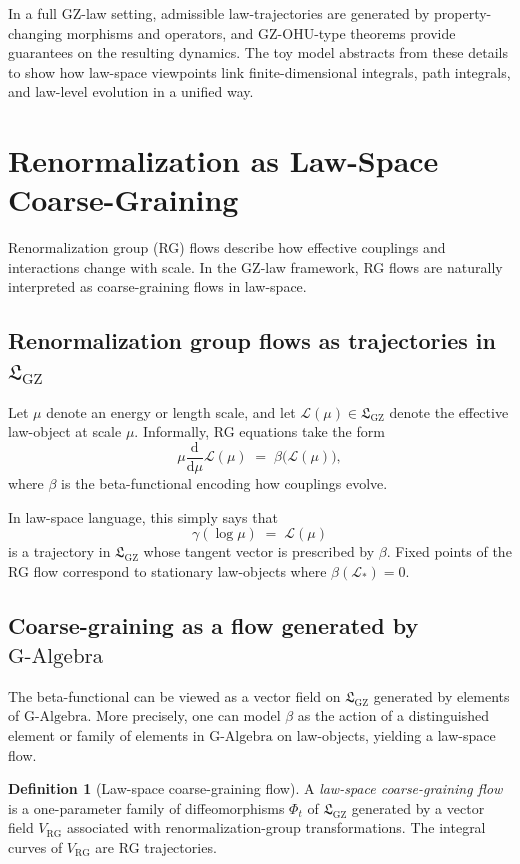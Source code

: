 \documentclass[11pt]{book}
\newcommand{\GAlgebra}{\text{G-Algebra}}
\newcommand{\GZLS}{\ensuremath{\mathfrak{L}_{\mathrm{GZ}}}}
\theoremstyle{plain}
\theoremstyle{definition}
\newtheorem{definition}[theorem]{Definition}
\theoremstyle{remark}
\begin{document}
In a full GZ-law setting, admissible law-trajectories are generated by
property-changing morphisms and operators, and GZ-OHU-type theorems
provide guarantees on the resulting dynamics. The toy model abstracts
from these details to show how law-space viewpoints link
finite-dimensional integrals, path integrals, and law-level evolution
in a unified way.



\section{Renormalization as Law-Space Coarse-Graining}
\label{sec:renorm-law-coarse}



Renormalization group (RG) flows describe how effective couplings and
interactions change with scale. In the GZ-law framework, RG flows are
naturally interpreted as coarse-graining flows in law-space.

\subsection{Renormalization group flows as trajectories in \texorpdfstring{$\GZLS$}{GZ-LS}}

Let $\mu$ denote an energy or length scale, and let
$\mathcal{L}(\mu) \in \GZLS$ denote the effective law-object at scale
$\mu$. Informally, RG equations take the form
\[
   \mu \frac{\mathrm{d}}{\mathrm{d}\mu} \mathcal{L}(\mu)
   \;=\;
   \beta\bigl(\mathcal{L}(\mu)\bigr),
\]
where $\beta$ is the beta-functional encoding how couplings evolve.

In law-space language, this simply says that
\[
   \gamma(\log\mu) \;=\; \mathcal{L}(\mu)
\]
is a trajectory in $\GZLS$ whose tangent vector is prescribed by
$\beta$. Fixed points of the RG flow correspond to stationary
law-objects where $\beta(\mathcal{L}_\ast) = 0$.

\subsection{Coarse-graining as a flow generated by \texorpdfstring{$\GAlgebra$}{G-Algebra}}

The beta-functional can be viewed as a vector field on $\GZLS$
generated by elements of $\GAlgebra$. More precisely, one can model
$\beta$ as the action of a distinguished element or family of elements
in $\GAlgebra$ on law-objects, yielding a law-space flow.

\begin{definition}[Law-space coarse-graining flow]
  A \emph{law-space coarse-graining flow} is a one-parameter family of
  diffeomorphisms $\Phi_t$ of $\GZLS$ generated by a vector field
  $V_{\mathrm{RG}}$ associated with renormalization-group transformations.
  The integral curves of $V_{\mathrm{RG}}$ are RG trajectories.
\end{definition}
\end{document}
